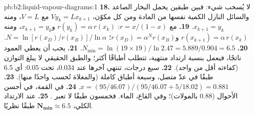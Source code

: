 \begin{solution}{pb:b2:liquid-vapour-diagrams:1}
\textbf{18.} لا يُسحب شيء: فبين طبقين يحمل البخار الصاعد
والسائل النازل الكمية نفسها من المادة ومن كل مكوّن،
$V y_k = L x_{k+1}$ مع $V = L$، ومنه $x_{k+1} = y_k$.
\textbf{19.} مع $r = x/(1 - x)$: $r(y_k) = \alpha\,r(x_k)$ و$x_{k+1} = y_k$، ومنه
$r(x_{k+1}) = \alpha\,r(x_k)$ و$r(x_D) = \alpha^N r(x_B)$؛ $N = \ln[r(x_D)/
r(x_B)]/\ln\alpha$.
\textbf{20.} $N_{\min} = \ln(19 \times 19)/\ln 2.47 = 5.889/0.904 = 6.5$.
\textbf{21.} يجب أن يعطي العمود ناتجًا، فيعمل بنسبة ارتداد منتهية،
تتطلب أطباقًا أكثر؛ والطبق الحقيقي لا يبلغ التوازن (كفاءته
أقل من واحد).
\textbf{22.} سبع درجات، تنتهي آخرها عند 0.034، تحت 0.05: أي 6.5 طبقًا في
عدّ متصل، وسبعة أطباق كاملة (والمغلاة تُحسب واحدًا منها).
\textbf{23.} $x = (95/46.07)/(95/46.07 + 5/18.02) = 0.881$.
\textbf{24.} في القمة،  في أحسن الأحوال (0.88 بالمولات)؛ وفي القاع،
الماء. فخمسون طبقًا لا تعبر .
\textbf{25.} عند الارتداد الكلي، $\boldsymbol{N_{\min} \approx 6.5}$ طبقًا
نظريًا.
\end{solution}
